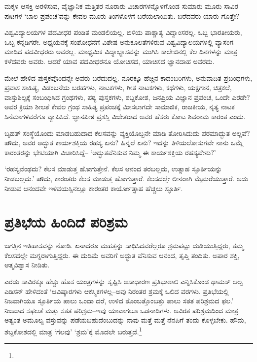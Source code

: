 
ಮಕ್ಕಳ ಆಸಕ್ತಿ ಅರಳಿಸುವ, ವೈಜ್ಞಾನಿಕ ಮತ್ತಿತರ ನೂರಾರು ವಿಚಾರಗಳನ್ನೊಳಗೊಂಡ ಸುಮಾರು ಮೂರು ಸಾವಿರ ಪುಟಗಳ ‘ಬಾಲ ಪ್ರಪಂಚ’ವನ್ನು ಕೇವಲ ಮೂರು ತಿಂಗಳೊಳಗೆ ಬರೆಯ\-ಲಾಯಿತು. ಬರೆದವರು ಯಾರು ಗೊತ್ತೇ?

\vskip 2pt

ವಿಶ್ವವಿದ್ಯಾಲಯಗಳ ಪದವೀಧರ ಪಂಡಿತ ಮಂಡಲಿಯಲ್ಲ. ಬಿಳಿಯ ಪಾಶ್ಚಾತ್ಯ ವಿದ್ವಾಂಸರಲ್ಲ. ಒಬ್ಬ ಭಾರತೀಯರು, ಒಬ್ಬ ಕನ್ನಡಿಗರೇ. ಅಧ್ಯಯನಕ್ಕೆ ಸಂಶೋಧನೆಗೆ ವಿಶೇಷ ಅನುಕೂಲತೆಗಳಿರುವ ವಿಶ್ವವಿದ್ಯಾಲಯಗಳಲ್ಲಿ ವ್ಯಾಸಂಗ ಮಾಡಿದ ಪದವೀಧರರು ಅವರಲ್ಲ. ಮಾಧ್ಯಮಿಕ ವಿದ್ಯಾಭ್ಯಾಸವನ್ನು ಮುಗಿಸಿ ಕಾಲೇಜಿನಲ್ಲಿ ಕೆಲ ದಿನಗಳನ್ನು ಮಾತ್ರ ಕಳೆದವರು ಅವರು. ಆದರೆ ಯಾವ ಪದವೀಧರನೂ ಯೋಚಿಸದ, ಯಾಚಿಸದ ಜ್ಞಾನದಾಹ ಅವರದು.

\vskip 2pt

ಮೇಲೆ ಹೇಳಿದ ಪುಸ್ತಕವೊಂದನ್ನೇ ಅವರು ಬರೆದುದಲ್ಲ. ನೂರಕ್ಕೂ ಹೆಚ್ಚಿನ ಕಾದಂಬರಿಗಳು, ಅನುವಾದಿತ ಪ್ರಬಂಧಗಳು, ಪ್ರವಾಸ ಸಾಹಿತ್ಯ, ವಿಡಂಬನೆಯ ಬರಹಗಳು, ನಾಟಕಗಳು, ಗೀತ ನಾಟಕಗಳು, ಕಥೆಗಳು, ಯಕ್ಷಗಾನ, ಚಿತ್ರಕಲೆ, ವಾಸ್ತುಶಿಲ್ಪಕ್ಕೆ ಸಂಬಂಧಿಸಿದ ಗ್ರಂಥಗಳು, ಪಠ್ಯ ಪುಸ್ತಕಗಳು, ಶಬ್ದಕೋಶ, ಜನಪ್ರಿಯ ವಿಜ್ಞಾನ ಪ್ರಪಂಚ, ಒಂದೇ ಎರಡೇ? ಅವರ ಕ್ರಿಯಾ ಶೀಲತೆ ಕೇವಲ ಗ್ರಂಥ ಸಾಹಿತ್ಯ ಪ್ರಪಂಚಕ್ಕೆ ಮೀಸಲಾಗದೇ ಸಾಮಾಜಿಕ, ರಾಜಕೀಯ, ನೃತ್ಯ ನಾಟಕ ಸಿನೆಮಾಗಳವರೆಗೂ ವ್ಯಾಪಿಸಿದೆ. ಜ್ಞಾನಪೀಠ ಪ್ರಶಸ್ತಿ ವಿಜೇತರಾದ ಅವರ ಹೆಸರು ಕೋಟ ಶಿವರಾಮ ಕಾರಂತ ಎಂದು.

\vskip 2pt

ಬೃಹತ್ ಸಂಸ್ಥೆಯೊಂದು ಮಾಡಬಹುದಾದ ಕೆಲಸವನ್ನು ವ್ಯಕ್ತಿಯೊಬ್ಬನೇ ಮಾಡಿ ತೋರಿಸಿ\-ದುದು ಪರಮಾದ್ಭುತ ಅಲ್ಲವೆ? ಹೌದು, ಅವರ ಅದ್ಭುತ ಕಾರ್ಯಶಕ್ತಿಯ ರಹಸ್ಯ ಏನು? ಹಿನ್ನಲೆ ಏನು? ಇದನ್ನು ತಿಳಿಯಲೋಸುಗವೇ ನಾನು ಒಮ್ಮೆ ಕಾರಂತರನ್ನು ಭೇಟಿಯಾಗಿ ವಿಚಾರಿಸಿದ್ದೆ– ‘ಅದ್ಭುತವೆನಿಸುವ ನಿಮ್ಮ ಈ ಕಾರ್ಯಶಕ್ತಿಯ ರಹಸ್ಯವೇನು?’

‘ರಹಸ್ಯವೆಂಥದು? ಕೆಲಸ ಮಾಡುತ್ತ ಹೋಗುತ್ತೇನೆ. ಕೆಲಸ ಆನಂದ ತರಬಲ್ಲದು, ಉತ್ಸಾಹ ಸ್ಫೂರ್ತಿಯನ್ನು ನೀಡಬಲ್ಲದು.’ ಹೌದು, ಕಾರಂತರು ಕೆಲಸ ಮಾಡುತ್ತ ಹೋಗುತ್ತಾರೆ. ಕೆಲಸದಲ್ಲೇ ಲೀನರಾಗಿ ಮೈಮರೆಯುತ್ತಾರೆ. ಅದು ನೀಡುವ ಆನಂದವೇ ಇಳಿವಯಸ್ಸಿನಲ್ಲೂ ಕಾರಂತರ ಕಾರ್ಯೋತ್ಸಾಹ ಹೆಚ್ಚಲು ಸ್ಫೂರ್ತಿ.


\section*{ಪ್ರತಿಭೆಯ ಹಿಂದಿದೆ ಪರಿಶ್ರಮ}


ಜಗತ್ತಿನ ಇತಿಹಾಸವನ್ನು ನೋಡಿ. ಏನಾದರೂ ಮಹತ್ತನ್ನು ಸಾಧಿಸಿದವರೆಲ್ಲರೂ ಶ್ರಮಪಟ್ಟು ದುಡಿಯುತ್ತಿದ್ದರು, ತಮ್ಮ ಕೆಲಸದಲ್ಲೇ ಮಗ್ನರಾಗುತ್ತಿದ್ದರು. ಈ ದುಡಿಮೆ ಅವರಿಗೆ ಅದ್ಭುತ ವೆನಿಸುವ ಆನಂದ, ತೃಪ್ತಿ ತಂದಿತು. ಅಪಾರ ಶಕ್ತಿ, ಆತ್ಮವಿಶ್ವಾಸ ನೀಡಿತು.

ಎರಡು ಸಾವಿರಕ್ಕೂ ಹೆಚ್ಚು ಹೊಸ ಯಂತ್ರಗಳನ್ನು ಸೃಷ್ಟಿಸಿ ಅಸಾಧಾರಣ ಪ್ರತಿಭಾಶಾಲಿ ಎನ್ನಿಸಿಕೊಂಡ ಥಾಮಸ್ ಆಲ್ವ ಎಡಿಸನ್ ಹೇಳಿದಂತೆ ‘ಆವಿಷ್ಕಾರಗಳು ಆಕಸ್ಮಿಕಗಳಲ್ಲ–ಅವು ನಿರಂತರ ಶ್ರಮಕ್ಕೆ ಒಲಿದ ವರಗಳು. ಪ್ರತಿಭೆಯಲ್ಲಿ ನಿಜವಾಗಿಯೂ ಸ್ಫೂರ್ತಿಯ ಪಾಲು ಒಂದಾ ದರೆ, ಉಳಿದ ತೊಂಬತ್ತೊಂಬತ್ತು ಪಾಲು ಸತತ ಪರಿಶ್ರಮದ ಫಲ.’ ನಿಜವಾದ ಸಫಲತೆ ಮತ್ತು ಸತತ ಪರಿಶ್ರಮ–ಇವು ಯಾವಾಗಲೂ ಒಡನಾಡಿಗಳು. ಅವಿರತ ಪರಿಶ್ರಮದಿಂದ ಮಾತ್ರ ಅತ್ಯಂತ ಅಮೂಲ್ಯ ವಸ್ತುವನ್ನು ಪಡೆಯಬಹುದೆಂಬುದನ್ನು ನಾವು ಮತ್ತೆ ಮತ್ತೆ ನೆನಪಿಗೆ ತಂದು ಕೊಳ್ಳಬೇಕು. ಹೌದು, ಶಬ್ದಕೋಶದಲ್ಲಿ ಮಾತ್ರ ‘ಗೆಲವು’ ‘ಶ್ರಮ’ಕ್ಕೆ ಮೊದಲೇ ಬರುತ್ತದೆ.\footnote{}

